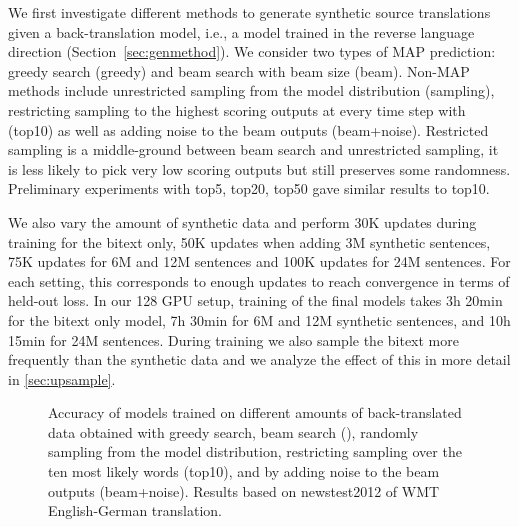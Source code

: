 \documentclass[11pt,a4paper]{article}
\begin{document}
We first investigate different methods to generate synthetic source translations given a back-translation model, i.e., a model trained in the reverse language direction (Section~\ref{sec:genmethod}).
We consider two types of MAP prediction: greedy search (greedy) and beam search with beam size  (beam). 
Non-MAP methods include unrestricted sampling from the model distribution (sampling), restricting sampling to the  highest scoring outputs at every time step with  (top10) as well as adding noise to the beam outputs (beam+noise).
Restricted sampling is a middle-ground between beam search and unrestricted sampling, it is less likely to pick very low scoring outputs but still preserves some randomness. Preliminary experiments with top5, top20, top50 gave similar results to top10.

We also vary the amount of synthetic data and perform 30K updates during training for the bitext only, 50K updates when adding 3M synthetic sentences, 75K updates for 6M and 12M sentences and 100K updates for 24M sentences.
For each setting, this corresponds to enough updates to reach convergence in terms of held-out loss. 
In our 128 GPU setup, training of the final models takes 3h 20min for the bitext only model, 7h 30min for 6M and 12M synthetic sentences, and 10h 15min for 24M sentences. 
During training we also sample the bitext more frequently than the synthetic data and we analyze the effect of this in more detail in \textsection\ref{sec:upsample}.

\begin{figure}[t]
\begin{center}
\caption{Accuracy of models trained on different amounts of back-translated data obtained with greedy search, beam search (), randomly sampling from the model distribution, restricting sampling over the ten most likely words (top10), and by adding noise to the beam outputs (beam+noise). Results based on newstest2012 of WMT English-German translation.
\label{fig:genmethod}}
\end{center}
\end{figure}
\end{document}
